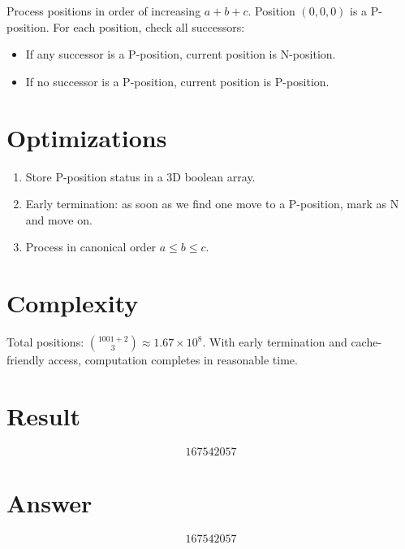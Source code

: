\documentclass[12pt]{article}
\begin{document}
Process positions in order of increasing $a+b+c$. Position $(0,0,0)$ is a P-position. For each position, check all successors:

\begin{itemize}
    \item If any successor is a P-position, current position is N-position.
    \item If no successor is a P-position, current position is P-position.
\end{itemize}

\section{Optimizations}

\begin{enumerate}
    \item Store P-position status in a 3D boolean array.
    \item Early termination: as soon as we find one move to a P-position, mark as N and move on.
    \item Process in canonical order $a \le b \le c$.
\end{enumerate}

\section{Complexity}

Total positions: $\binom{1001+2}{3} \approx 1.67 \times 10^8$. With early termination and cache-friendly access, computation completes in reasonable time.

\section{Result}

\[
\boxed{167542057}
\]

\section{Answer}

\[
\boxed{167542057}
\]
\end{document}
